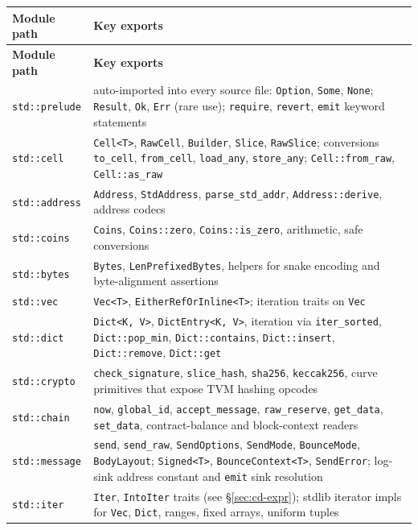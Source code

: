 \documentclass[12pt,oneside]{article}
\begin{document}
\begin{longtable}{|l|p{}|}
\hline
\textbf{Module path} & \textbf{Key exports} \\ \hline
\endfirsthead
\hline
\textbf{Module path} & \textbf{Key exports} \\ \hline
\endhead
\verb|std::prelude| & auto-imported into every source file:
\verb|Option|, \verb|Some|, \verb|None|;
\verb|Result|, \verb|Ok|, \verb|Err| (rare use);
\verb|require|, \verb|revert|, \verb|emit| keyword statements \\ \hline
\verb|std::cell| & \verb|Cell<T>|, \verb|RawCell|, \verb|Builder|,
\verb|Slice|, \verb|RawSlice|;
conversions \verb|to_cell|, \verb|from_cell|, \verb|load_any|,
\verb|store_any|; \verb|Cell::from_raw|, \verb|Cell::as_raw| \\ \hline
\verb|std::address| & \verb|Address|, \verb|StdAddress|,
\verb|parse_std_addr|, \verb|Address::derive|, address codecs \\ \hline
\verb|std::coins| & \verb|Coins|, \verb|Coins::zero|, \verb|Coins::is_zero|,
arithmetic, safe conversions \\ \hline
\verb|std::bytes| & \verb|Bytes|, \verb|LenPrefixedBytes|, helpers for
snake encoding and byte-alignment assertions \\ \hline
\verb|std::vec| & \verb|Vec<T>|, \verb|EitherRefOrInline<T>|; iteration
traits on \verb|Vec| \\ \hline
\verb|std::dict| & \verb|Dict<K, V>|, \verb|DictEntry<K, V>|, iteration via
\verb|iter_sorted|, \verb|Dict::pop_min|, \verb|Dict::contains|,
\verb|Dict::insert|, \verb|Dict::remove|, \verb|Dict::get| \\ \hline
\verb|std::crypto| & \verb|check_signature|, \verb|slice_hash|,
\verb|sha256|, \verb|keccak256|, curve primitives that expose TVM hashing
opcodes \\ \hline
\verb|std::chain| & \verb|now|, \verb|global_id|, \verb|accept_message|,
\verb|raw_reserve|, \verb|get_data|, \verb|set_data|, contract-balance
and block-context readers \\ \hline
\verb|std::message| & \verb|send|, \verb|send_raw|, \verb|SendOptions|,
\verb|SendMode|, \verb|BounceMode|, \verb|BodyLayout|;
\verb|Signed<T>|, \verb|BounceContext<T>|, \verb|SendError|;
log-sink address constant and \verb|emit| sink resolution \\ \hline
\verb|std::iter| & \verb|Iter|, \verb|IntoIter| traits (see
\S\ref{sec:cd-expr}); stdlib iterator impls for \verb|Vec|, \verb|Dict|,
ranges, fixed arrays, uniform tuples \\ \hline

\end{longtable}
\end{document}
